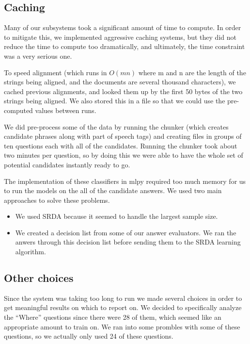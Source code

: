 \documentclass{article}
\begin{document}
\subsection{Caching}

Many of our subsystems took a significant amount of time to compute.  In order
to mitigate this, we implemented aggressive caching systems, but they did not
reduce the time to compute too dramatically, and ultimately, the time constraint
was a very serious one.

To speed alignment (which runs in $O(mn)$ where m and n are the length of the strings being aligned, and the documents are several thousand characters), we cached previous alignments, and looked them up by the first 50 bytes of the two strings being aligned.  We also stored this in a file so that we could use the pre-computed values between runs.

We did pre-process some of the data by running the chunker (which creates
candidate phrases along with part of speech tags) and creating files in
groups of ten questions each with all of the candidates. Running the chunker
took about two minutes per question, so by doing this we were able to have
the whole set of potential candidates instantly ready to go.

The implementation of these classifiers in mlpy required too much memory for
us to run the models on the all of the candidate answers. We used two main approaches
to solve these problems.
\begin{itemize}
\item We used SRDA because it seemed to handle the largest sample size.
\item We created a decision list from some of our answer evaluators. We ran the anwers
through this decision list before sending them to the SRDA learning algorithm.
\end{itemize}

\subsection{Other choices}
Since the system was taking too long to run we made several choices in order
to get meaningful results on which to report on. We decided to specifically analyze
the ``Where'' questions since there were 28 of them, which seemed like an appropriate
amount to train on. We ran into some prombles with some of these questions, so we
actually only used 24 of these questions. 
\end{document}
